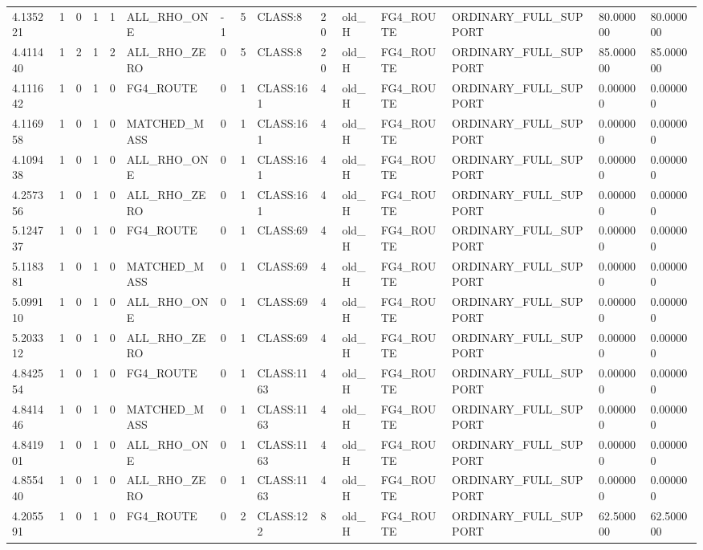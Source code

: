\begin{tabular}{lllllllllllllll}
4.135221 & 1 & 0 & 1 & 1 & ALL\_RHO\_ONE & -1 & 5 & CLASS:8 & 20 & old\_H & FG4\_ROUTE & ORDINARY\_FULL\_SUPPORT & 80.000000 & 80.000000 \\
4.411440 & 1 & 2 & 1 & 2 & ALL\_RHO\_ZERO & 0 & 5 & CLASS:8 & 20 & old\_H & FG4\_ROUTE & ORDINARY\_FULL\_SUPPORT & 85.000000 & 85.000000 \\
4.111642 & 1 & 0 & 1 & 0 & FG4\_ROUTE & 0 & 1 & CLASS:161 & 4 & old\_H & FG4\_ROUTE & ORDINARY\_FULL\_SUPPORT & 0.000000 & 0.000000 \\
4.116958 & 1 & 0 & 1 & 0 & MATCHED\_MASS & 0 & 1 & CLASS:161 & 4 & old\_H & FG4\_ROUTE & ORDINARY\_FULL\_SUPPORT & 0.000000 & 0.000000 \\
4.109438 & 1 & 0 & 1 & 0 & ALL\_RHO\_ONE & 0 & 1 & CLASS:161 & 4 & old\_H & FG4\_ROUTE & ORDINARY\_FULL\_SUPPORT & 0.000000 & 0.000000 \\
4.257356 & 1 & 0 & 1 & 0 & ALL\_RHO\_ZERO & 0 & 1 & CLASS:161 & 4 & old\_H & FG4\_ROUTE & ORDINARY\_FULL\_SUPPORT & 0.000000 & 0.000000 \\
5.124737 & 1 & 0 & 1 & 0 & FG4\_ROUTE & 0 & 1 & CLASS:69 & 4 & old\_H & FG4\_ROUTE & ORDINARY\_FULL\_SUPPORT & 0.000000 & 0.000000 \\
5.118381 & 1 & 0 & 1 & 0 & MATCHED\_MASS & 0 & 1 & CLASS:69 & 4 & old\_H & FG4\_ROUTE & ORDINARY\_FULL\_SUPPORT & 0.000000 & 0.000000 \\
5.099110 & 1 & 0 & 1 & 0 & ALL\_RHO\_ONE & 0 & 1 & CLASS:69 & 4 & old\_H & FG4\_ROUTE & ORDINARY\_FULL\_SUPPORT & 0.000000 & 0.000000 \\
5.203312 & 1 & 0 & 1 & 0 & ALL\_RHO\_ZERO & 0 & 1 & CLASS:69 & 4 & old\_H & FG4\_ROUTE & ORDINARY\_FULL\_SUPPORT & 0.000000 & 0.000000 \\
4.842554 & 1 & 0 & 1 & 0 & FG4\_ROUTE & 0 & 1 & CLASS:1163 & 4 & old\_H & FG4\_ROUTE & ORDINARY\_FULL\_SUPPORT & 0.000000 & 0.000000 \\
4.841446 & 1 & 0 & 1 & 0 & MATCHED\_MASS & 0 & 1 & CLASS:1163 & 4 & old\_H & FG4\_ROUTE & ORDINARY\_FULL\_SUPPORT & 0.000000 & 0.000000 \\
4.841901 & 1 & 0 & 1 & 0 & ALL\_RHO\_ONE & 0 & 1 & CLASS:1163 & 4 & old\_H & FG4\_ROUTE & ORDINARY\_FULL\_SUPPORT & 0.000000 & 0.000000 \\
4.855440 & 1 & 0 & 1 & 0 & ALL\_RHO\_ZERO & 0 & 1 & CLASS:1163 & 4 & old\_H & FG4\_ROUTE & ORDINARY\_FULL\_SUPPORT & 0.000000 & 0.000000 \\
4.205591 & 1 & 0 & 1 & 0 & FG4\_ROUTE & 0 & 2 & CLASS:122 & 8 & old\_H & FG4\_ROUTE & ORDINARY\_FULL\_SUPPORT & 62.500000 & 62.500000 \\

\end{tabular}
